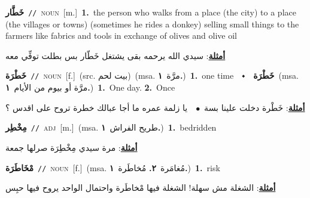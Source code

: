 \documentclass[10pt,a4paper,twoside]{article} %
\begin{document}
\begin{multicols}{2}
{\setlength\topsep{0pt}\textbf{\foreignlanguage{arabic}{خَطَّار}}\ {\color{gray}\texttt{//}\color{black}}\ \textsc{noun}\ [m.]\ \textbf{1.}~the person who walks from a place (the city) to a place (the villages or towns) (sometimes he rides a donkey) selling small things to the farmers like fabrics and tools in exchange of olives and olive oil\  \begin{flushright}\color{gray}\foreignlanguage{arabic}{\textbf{\underline{\foreignlanguage{arabic}{أمثلة}}}: سيدي الله يرحمه بقى يشتغل خَطّار بس بطلت توفِّي معه}\end{flushright}\color{black}} \vspace{2mm}

{\setlength\topsep{0pt}\textbf{\foreignlanguage{arabic}{خَطْرَة}}\ {\color{gray}\texttt{//}\color{black}}\ \textsc{noun}\ [f.]\ (src. \color{gray}\foreignlanguage{arabic}{بيت لحم}\color{black})\ \color{gray}(msa. \foreignlanguage{arabic}{مرَّة}~\foreignlanguage{arabic}{\textbf{١.}})\color{black}\ \textbf{1.}~one time\ \ $\smblkdiamond$\ \ \setlength\topsep{0pt}\textbf{\foreignlanguage{arabic}{خَطْرَة}}\ \color{gray}(msa. \foreignlanguage{arabic}{مرَّة أو بيوم من الأيام}~\foreignlanguage{arabic}{\textbf{١.}})\color{black}\ \textbf{1.}~One day.  \textbf{2.}~Once\  \begin{flushright}\color{gray}\foreignlanguage{arabic}{\textbf{\underline{\foreignlanguage{arabic}{أمثلة}}}: خَطْرة دخلت علينا بسة\ $\bullet$\ \  يا زلمة عمره ما أجا عبالك خطرة تروح على اقدس ؟}\end{flushright}\color{black}} \vspace{2mm}

{\setlength\topsep{0pt}\textbf{\foreignlanguage{arabic}{مِخْطِر}}\ {\color{gray}\texttt{//}\color{black}}\ \textsc{adj}\ [m.]\ \color{gray}(msa. \foreignlanguage{arabic}{طريح الفراش}~\foreignlanguage{arabic}{\textbf{١.}})\color{black}\ \textbf{1.}~bedridden\  \begin{flushright}\color{gray}\foreignlanguage{arabic}{\textbf{\underline{\foreignlanguage{arabic}{أمثلة}}}: مرة سيدي مِخْطِرَة صرلها جمعة}\end{flushright}\color{black}} \vspace{2mm}

{\setlength\topsep{0pt}\textbf{\foreignlanguage{arabic}{مْخَاطَرَة}}\ {\color{gray}\texttt{//}\color{black}}\ \textsc{noun}\ [f.]\ \color{gray}(msa. \foreignlanguage{arabic}{مُغامَرة}~\foreignlanguage{arabic}{\textbf{٢.}}  \foreignlanguage{arabic}{مُخاطَرة}~\foreignlanguage{arabic}{\textbf{١.}})\color{black}\ \textbf{1.}~risk\  \begin{flushright}\color{gray}\foreignlanguage{arabic}{\textbf{\underline{\foreignlanguage{arabic}{أمثلة}}}: الشغلة مش سهلة! الشغلة فيها مْخاطَرة واحتمال الواحد يروح فيها حبِس}\end{flushright}\color{black}} \vspace{2mm}


\end{multicols}
\end{document}
